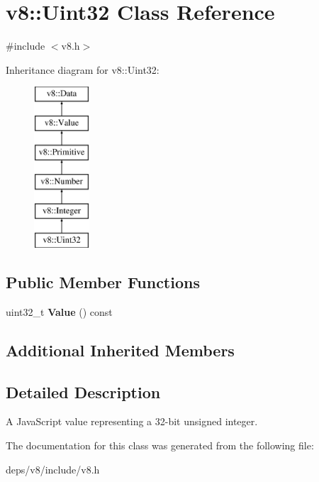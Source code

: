 \hypertarget{classv8_1_1_uint32}{}\section{v8\+:\+:Uint32 Class Reference}
\label{classv8_1_1_uint32}


{\ttfamily \#include $<$v8.\+h$>$}

Inheritance diagram for v8\+:\+:Uint32\+:\begin{figure}[H]
\begin{center}
\leavevmode
\includegraphics[height=6.000000cm]{classv8_1_1_uint32}
\end{center}
\end{figure}
\subsection*{Public Member Functions}
\begin{DoxyCompactItemize}
\item 
\hypertarget{classv8_1_1_uint32_ad59790c380f4de98c4cc479140812fe0}{}uint32\+\_\+t {\bfseries Value} () const \label{classv8_1_1_uint32_ad59790c380f4de98c4cc479140812fe0}

\end{DoxyCompactItemize}
\subsection*{Additional Inherited Members}


\subsection{Detailed Description}
A Java\+Script value representing a 32-\/bit unsigned integer. 

The documentation for this class was generated from the following file\+:\begin{DoxyCompactItemize}
\item 
deps/v8/include/v8.\+h\end{DoxyCompactItemize}
